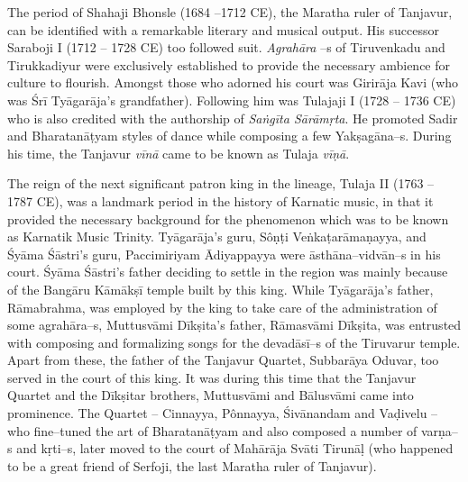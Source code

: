 The period of Shahaji Bhonsle (1684 –1712 CE), the Maratha ruler of Tanjavur, can be identified with a remarkable literary and musical output. His successor Saraboji I (1712 – 1728 CE) too followed suit. \textit{Agrahāra} –s of Tiruvenkadu and Tirukkadiyur were exclusively established to provide the necessary ambience for culture to flourish. Amongst those who adorned his court was Girirāja Kavi (who was Śrī Tyāgarāja’s grandfather). Following him was Tulajaji I (1728 – 1736 CE) who is also credited with the authorship of \textit{Saṅgīta Sārāmṛta}. He promoted Sadir and Bharatanāṭyam styles of dance while composing a few Yakṣagāna–s. During his time, the Tanjavur \textit{vīnā} came to be known as Tulaja \textit{vīṇā}.

The reign of the next significant patron king in the lineage, Tulaja II (1763 – 1787 CE), was a landmark period in the history of Karnatic music, in that it provided the necessary background for the phenomenon which was to be known as Karnatik Music Trinity. Tyāgarāja’s guru, Sôṇṭi Veṅkaṭarāmaṇayya, and Śyāma Śāstri’s guru, Paccimiriyam Ādiyappayya were āsthāna–vidvān–s in his court. Śyāma Śāstri’s father deciding to settle in the region was mainly because of the Bangāru Kāmākṣī temple built by this king. While Tyāgarāja’s father, Rāmabrahma, was employed by the king to take care of the administration of some agrahāra–s, Muttusvāmi Dīkṣita’s father, Rāmasvāmi Dīkṣita, was entrusted with composing and formalizing songs for the devadāsī–s of the Tiruvarur temple. Apart from these, the father of the Tanjavur Quartet, Subbarāya Oduvar, too served in the court of this king. It was during this time that the Tanjavur Quartet and the Dīkṣitar brothers, Muttusvāmi and Bālusvāmi came into prominence. The Quartet – Cinnayya, Pônnayya, Śivānandam and Vaḍivelu – who fine–tuned the art of Bharatanāṭyam and also composed a number of varṇa–s and kṛti–s, later moved to the court of Mahārāja Svāti Tirunāḷ (who happened to be a great friend of Serfoji, the last Maratha ruler of Tanjavur).

